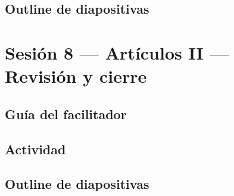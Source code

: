 \documentclass[11pt,a4paper]{report}
\begin{document}
\subsection*{Outline de diapositivas}


\section{Sesión 8 --- Artículos II --- Revisión y cierre}

\subsection*{Guía del facilitador}

\subsection*{Actividad}

\subsection*{Outline de diapositivas}

\end{document}
